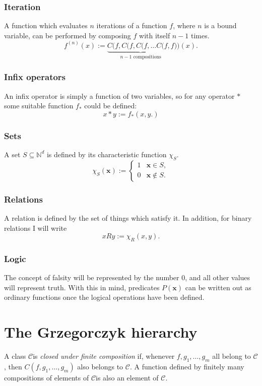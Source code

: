 \documentclass[a4paper]{article}
\newcommand{\NN}{\mathbb{N}}	%
\newcommand{\xvec}{\mathbf{x}}	%
\newcommand{\classC}{$\mathcal{C}$}
\theoremstyle{plain}
\theoremstyle{definition}
\begin{document}
\subsubsection{Iteration}
A function which evaluates $n$ iterations of a function $f$, where $n$ is a bound variable, can be performed by composing $f$ with itself $n-1$ times.
\[f^{(n)}(x) := \underbrace{C(f,C(f,C(f, \dots C(f,f}_{n-1 \textrm{ compositions}}) )(x).\]

\subsubsection{Infix operators}
An infix operator is simply a function of two variables, so for any operator $\ast$ some suitable function $f_{\ast}$ could be defined:
\[x \ast y := f_{\ast}(x,y.) \]

\subsubsection{Sets}
A set $S \subseteq \NN^d$ is defined by its characteristic function $\chi_S$.
\[\chi_S(\xvec) := \begin{cases}
 1 & \xvec \in S, \\
 0 & \xvec \notin S.
 \end{cases}
\]

\subsubsection{Relations}
A relation is defined by the set of things which satisfy it. In addition, for binary relations I will write
\[ x R y := \chi_R(x,y). \]

\subsubsection{Logic}
The concept of falsity will be represented by the number $0$, and all other values will represent truth. With this in mind, predicates $P(\xvec)$ can be written out as ordinary functions once the logical operations have been defined.

\section{The Grzegorczyk hierarchy \label{grzegorczyk}}
A class \classC is {\it closed under finite composition} if, whenever $f, g_1, \dots, g_m$ all belong to \classC, then $C(f,g_1, \dots, g_m)$ also belongs to \classC. A function defined by finitely many compositions of elements of \classC is also an element of \classC.
\end{document}
